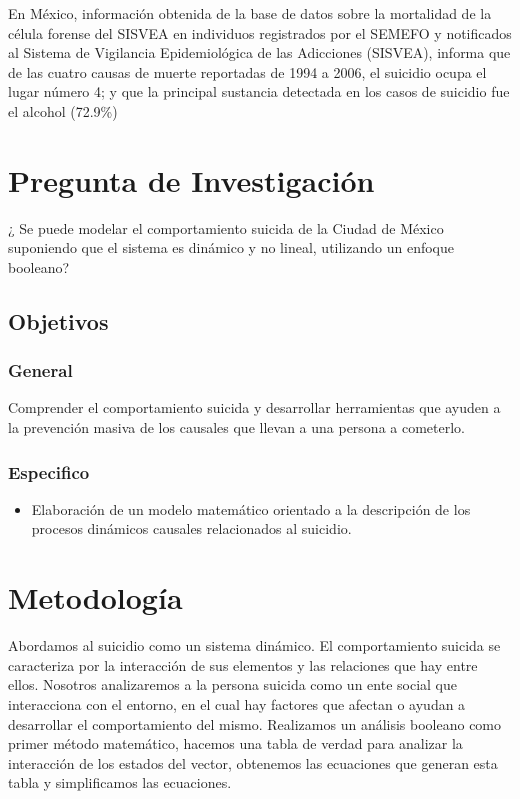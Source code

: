 {{En México, información obtenida de la base de datos sobre la mortalidad de la célula forense del SISVEA en individuos registrados por el SEMEFO y notificados al Sistema de Vigilancia Epidemiológica de las Adicciones (SISVEA), informa que de las cuatro causas de muerte reportadas de 1994 a 2006, el suicidio ocupa el lugar número 4; y que la principal sustancia detectada en los casos de suicidio fue el alcohol (72.9\%)
}

\section{Pregunta de Investigación}
{
¿ Se puede modelar el comportamiento suicida de la Ciudad de México suponiendo que el sistema es dinámico y no lineal, utilizando un enfoque booleano?

\subsection{Objetivos}
{
\subsubsection{General}
{
Comprender el comportamiento suicida y desarrollar herramientas que ayuden a la prevención masiva de los causales que llevan a una persona a cometerlo.
}
\subsubsection{Especifico}
{
\begin{itemize}
\item Elaboración de un modelo matemático orientado a la descripción de los procesos dinámicos causales relacionados al suicidio.
\end{itemize}

\section{Metodología}
{
Abordamos al suicidio como un sistema dinámico. El comportamiento suicida se caracteriza por la interacción de sus elementos y las relaciones que hay entre ellos. Nosotros analizaremos a la persona suicida como un ente social que interacciona con el entorno, en el cual hay factores que afectan o ayudan a desarrollar el comportamiento del mismo. Realizamos un análisis booleano como primer método matemático, hacemos una tabla de verdad para analizar la interacción de los estados del vector, obtenemos las ecuaciones que generan esta tabla y simplificamos las ecuaciones.\\

}}}}}
